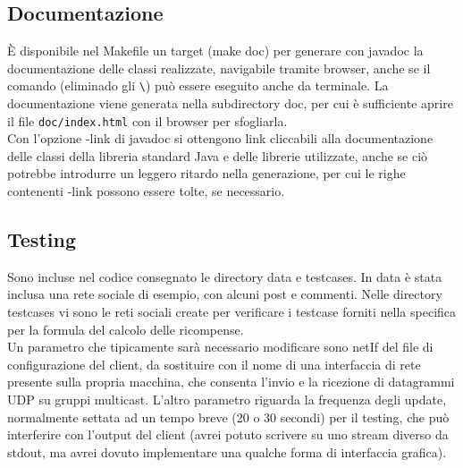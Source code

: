 \subsection{Documentazione}
È disponibile nel Makefile un target (make doc) per generare con javadoc la documentazione delle classi realizzate, navigabile tramite browser, anche se il comando (eliminado gli \verb|\|) può essere eseguito anche da terminale. La documentazione viene generata nella subdirectory doc, per cui è sufficiente aprire il file \verb|doc/index.html| con il browser per sfogliarla.\\
Con l'opzione -link di javadoc si ottengono link cliccabili alla documentazione delle classi della libreria standard Java e delle librerie utilizzate, anche se ciò potrebbe introdurre un leggero ritardo nella generazione, per cui le righe contenenti -link possono essere tolte, se necessario.

\subsection{Testing}
Sono incluse nel codice consegnato le directory data e testcases. In data è stata inclusa una rete sociale di esempio, con alcuni post e commenti. Nelle directory testcases vi sono
le reti sociali create per verificare i testcase forniti nella specifica per la formula del calcolo delle ricompense.\\
Un parametro che tipicamente sarà necessario modificare sono netIf del file di configurazione del client, da sostituire con il nome di una interfaccia di rete presente sulla propria
macchina, che consenta l'invio e la ricezione di datagrammi UDP su gruppi multicast. L'altro parametro riguarda la frequenza degli update, normalmente settata ad un tempo
breve (20 o 30 secondi) per il testing, che può interferire con l'output del client (avrei potuto scrivere su uno stream diverso da stdout, ma avrei dovuto implementare una qualche
forma di interfaccia grafica).